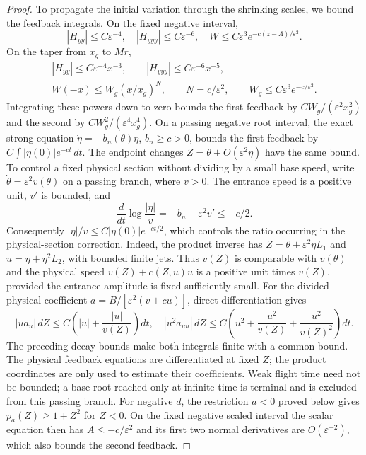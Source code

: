 \begin{proof}
To propagate the initial variation through the shrinking scales, we
bound the feedback integrals. On the fixed negative interval,
\[
 |H_{yy}|\le C\varepsilon^{-4},\quad
 |H_{yyy}|\le C\varepsilon^{-6},\quad
 W\le C\varepsilon^3e^{-c(z-\Lambda)/\varepsilon^2}.
\]
On the taper from $x_g$ to $Mr$,
\[
 \begin{gathered}
 |H_{yy}|\le C\varepsilon^{-4}x^{-3},\qquad
 |H_{yyy}|\le C\varepsilon^{-6}x^{-5},\\
 W(-x)\le W_g(x/x_g)^N,\qquad N=c/\varepsilon^2,\qquad
 W_g\le C\varepsilon^3e^{-c/\varepsilon^2}.
 \end{gathered}
\]
Integrating these powers down to zero bounds the first feedback by
$CW_g/(\varepsilon^2x_g^2)$ and the second by
$CW_g^2/(\varepsilon^4x_g^4)$. On a passing negative root interval,
the exact strong equation $\dot\eta=-b_n(\theta)\eta$,
$b_n\ge c>0$, bounds the first feedback by
$C\int|\eta(0)|e^{-ct}\,dt$. The endpoint changes
$Z=\theta+O(\varepsilon^2\eta)$ have the same bound. To control a
fixed physical section without dividing by a small base speed, write
$\dot\theta=\varepsilon^2v(\theta)$ on a passing branch, where $v>0$.
The entrance speed is a positive unit, $v'$ is bounded, and
\[
 \frac d{dt}\log\frac{|\eta|}{v}
       =-b_n-\varepsilon^2v'\le-c/2.
\]
Consequently $|\eta|/v\le C|\eta(0)|e^{-ct/2}$, which controls
the ratio occurring in the physical-section correction. Indeed, the
product inverse has $Z=\theta+\varepsilon^2\eta L_1$ and
$u=\eta+\eta^2L_2$, with bounded finite jets. Thus $v(Z)$ is
comparable with $v(\theta)$ and the physical speed
$v(Z)+c(Z,u)u$ is a positive unit times $v(Z)$, provided the entrance
amplitude is fixed sufficiently small. For the divided physical
coefficient $a=B/[\varepsilon^2(v+cu)]$, direct differentiation gives
\[
 |u a_u|\,dZ\le C\left(|u|+\frac{|u|}{v(Z)}\right)dt,
 \quad
 |u^2a_{uu}|\,dZ\le C\left(u^2+\frac{u^2}{v(Z)}
                                      +\frac{u^2}{v(Z)^2}\right)dt.
\]
The preceding decay bounds make both integrals finite with a common
bound. The physical feedback equations are differentiated at fixed
$Z$; the product coordinates are only used to estimate their
coefficients. Weak flight time need not be bounded; a base root
reached only at infinite time is terminal and is excluded from this
passing branch.
For negative $d$, the restriction $a<0$ proved below gives
$p_a(Z)\ge1+Z^2$ for $Z<0$. On the fixed negative scaled interval the
scalar equation then has $A\le-c/\varepsilon^2$ and its first two normal
derivatives are $O(\varepsilon^{-2})$, which also bounds the second
feedback.


\end{proof}
